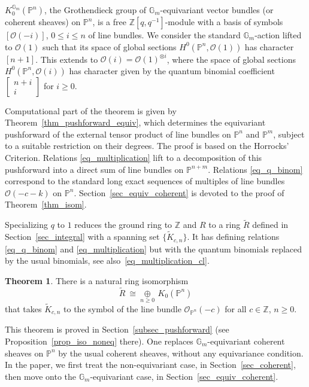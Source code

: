 \documentclass{article}
\def\Z{\mathbb Z}
\newcommand{\mcO}{\mathcal{O}}
\newcommand{\wtR}{\widetilde{R}}
\newcommand{\wtK}{\widetilde{K}}
\newcommand{\PP}{\mathbb{P}}
\newcommand{\oplusop}[1]{{\mathop{\oplus}\limits_{#1}}}
\theoremstyle{definition}
\newtheorem{thm}{Theorem}[section]
\theoremstyle{definition}
\begin{document}
 $K_0^{\mathbb{G}_m}(\PP^n)$, the Grothendieck group of $\mathbb{G}_m$-equivariant vector bundles (or coherent sheaves) on $\PP^n$, is a free $\Z[q,q^{-1}]$-module with a basis of symbols $[\mcO(-i)]$, $0\le i\le n$ of line bundles.
 We consider the standard $\mathbb{G}_m$-action lifted to $\mcO(1)$ such that its space of global sections $H^0(\PP^n, \mcO(1))$ has character $[n+1]$. This extends to $\mcO(i)=\mcO(1)^{\otimes i}$, where the space of global sections $H^0(\PP^n, \mcO(i))$ has character given by the quantum binomial coefficient $\left[ \begin{smallmatrix} n+i \\ i \end{smallmatrix} \right]$ for $i\ge 0$.

 Computational part of the theorem is given by Theorem~\ref{thm_pushforward_equiv},  which determines the equivariant pushforward of the external tensor product of line bundles on $\PP^n$ and $\PP^m$, subject to a suitable restriction on their degrees. The proof is based on the Horrocks' Criterion. Relations \eqref{eq_multiplication} lift to a decomposition of this pushforward into a direct sum of line bundles on $\PP^{n+m}$. Relations \eqref{eq_q_binom} correspond to the standard long exact sequences of multiples of line bundles $\mcO(-c-k)$ on $\PP^n$. Section~\ref{sec_equiv_coherent}  is devoted to the proof of Theorem~\ref{thm_isom}.

\vspace{0.07in}

Specializing $q$ to $1$ reduces the ground ring to $\Z$ and $R$ to a ring $\wtR$ defined in Section~\ref{sec_integral} with a spanning set $\{\wtK_{c,n}\}$. It has defining relations \eqref{eq_q_binom} and \eqref{eq_multiplication} but with the quantum binomials replaced by the usual binomials, see also~\eqref{eq_multiplication_cl}.

\begin{thm}\label{thm_isom_noneq}
    There is a natural ring isomorphism
\begin{equation}\label{eq_thm_isom_noneq}
    \wtR\ \cong \oplusop{n\ge 0}\, K_0(\PP^n)
    \end{equation}
    that takes $\wtK_{c,n}$ to the symbol of the line bundle $\mcO_{\PP^n}(-c)$ for all $c\in \Z$, $n\ge 0$.
\end{thm}

This theorem is proved in Section~\ref{subsec_pushforward} (see Proposition~\ref{prop_iso_noneq} there). One replaces $\mathbb{G}_m$-equivariant coherent sheaves on $\PP^n$ by the usual coherent sheaves, without any equivariance condition. In the paper, we first treat the non-equivariant case, in Section~\ref{sec_coherent}, then move onto the $\mathbb{G}_m$-equivariant case, in Section~\ref{sec_equiv_coherent}.
\end{document}
